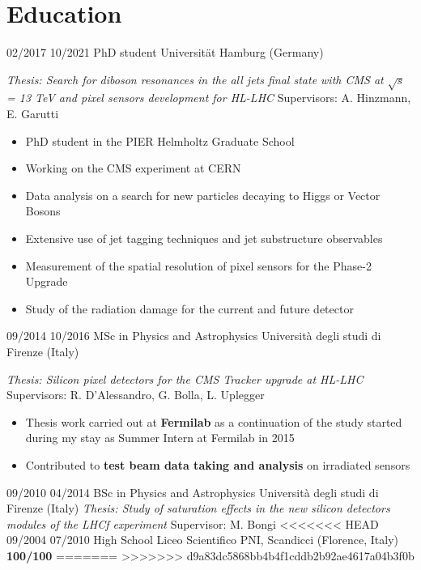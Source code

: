   \section{Education}
    \position
      {02/2017 \textemdash{} 10/2021}
      {PhD student}
      {Universit\"{a}t Hamburg (Germany)}
      {\textit{Thesis: Search for diboson resonances in the all jets final state with CMS at $\sqrt{s}$ = 13 TeV and pixel sensors development for HL-LHC} \newline  Supervisors: A. Hinzmann, E. Garutti  
      \begin{itemize}
\item PhD student in the PIER Helmholtz Graduate School
\item  Working on the CMS experiment at CERN
\item Data analysis on a search for new particles decaying to Higgs or Vector Bosons
\item Extensive use of jet tagging techniques and jet substructure observables
\item Measurement of the spatial resolution of pixel sensors for the Phase-2 Upgrade
\item Study of the radiation damage for the current and future detector
\end{itemize}}
  \position
      {09/2014 \textemdash{} 10/2016}
      {MSc in Physics and Astrophysics}
      {Universit\`a degli studi di Firenze (Italy)}
      {\textit{Thesis: Silicon pixel detectors for the CMS Tracker upgrade at HL-LHC} \newline Supervisors: R. D'Alessandro, G. Bolla, L. Uplegger  
            \begin{itemize}
\item Thesis work carried out at {\bf Fermilab} as a continuation of the study started during my stay as Summer Intern at Fermilab in 2015
\item Contributed to  {\bf test beam data taking and analysis} on irradiated sensors
\end{itemize}
 }
    \position
      {09/2010 \textemdash{} 04/2014}
      {BSc in Physics and Astrophysics}
      {Universit\`a degli studi di Firenze (Italy)}
      {\textit{Thesis:  Study of saturation effects in the new silicon detectors modules of the LHCf experiment}  \newline Supervisor: M. Bongi }
<<<<<<< HEAD
 \position
 {09/2004      \textemdash{} 07/2010}
 {High School}
 {Liceo Scientifico PNI, Scandicci (Florence, Italy)}
  {{\bf 100/100}}    
=======
>>>>>>> d9a83dc5868bb4b4f1cddb2b92ae4617a04b3f0b
\fi
